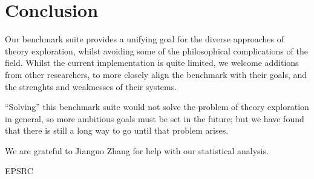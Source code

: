 
\section{Conclusion}
\label{sec:conclusion}


Our benchmark suite provides a unifying goal for the diverse approaches of
theory exploration, whilst avoiding some of the philosophical complications of
the field. Whilst the current implementation is quite limited, we welcome
additions from other researchers, to more closely align the benchmark with their
goals, and the strenghts and weaknesses of their systems.

``Solving'' this benchmark suite would not solve the problem of theory exploration in general,
so more ambitious goals must be set in the future; but we have found that there is still a
long way to go until that problem arises.

\begin{acknowledgements}
  We are grateful to Jianguo Zhang for help with our statistical analysis.

  EPSRC
\end{acknowledgements}





